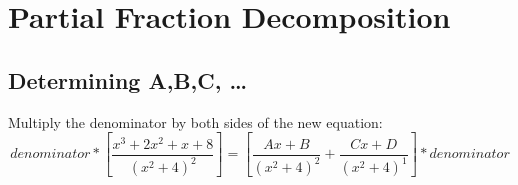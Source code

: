 \section{Partial Fraction Decomposition}
%
%
%
%
%
%
%
%
%
%
%

\subsection{Determining A,B,C, \dots}


Multiply the denominator by both sides of the new equation:
\[ {denominator}*\left[\frac{x^3+2x^2+x+8}{(x^2+4)^2}\right]=\left[\frac{Ax+B}{(x^2+4)^2}+\frac{Cx+D}{(x^2+4)^1}\right]*{denominator} \]

